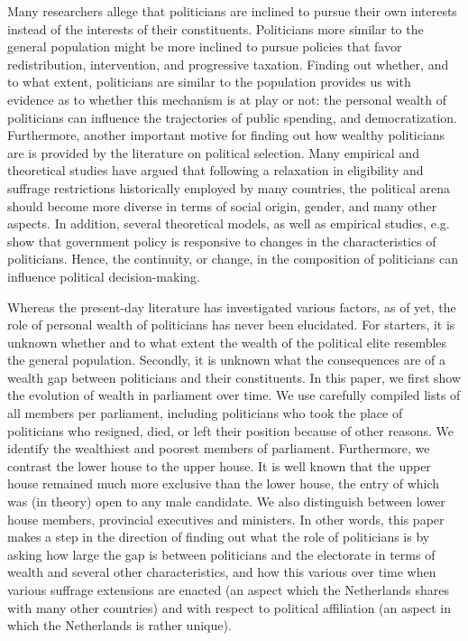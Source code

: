 Many researchers allege that politicians are inclined to pursue their own interests instead of the interests of their constituents. \autocite{lizzeri2004did, duggan2017political, corvalan2020political} Politicians more similar to the general population might be more inclined to pursue policies that favor redistribution, intervention, and progressive taxation. Finding out whether, and to what extent, politicians are similar to the population provides us with evidence as to whether this mechanism is at play or not: the personal wealth of politicians can influence the trajectories of public spending, and democratization. Furthermore, another important motive for finding out how wealthy politicians are is provided by the literature on political selection. Many empirical and theoretical studies have argued that following a relaxation in eligibility and suffrage restrictions historically employed by many countries, the political arena should  become more diverse in terms of social origin, gender, and many other aspects.\autocite{besley1997economic, besley2005political, bernini2018race} In addition, several theoretical models, as well as empirical studies, e.g.  show that government policy is responsive to changes in the characteristics of politicians. \autocite{meltzer1981rational, besley2011educated, chattopadhyay2004women, hayo2014political} Hence, the continuity, or change, in the composition of politicians can influence political decision-making. 

Whereas the present-day literature has investigated various factors, as of yet, the role of personal wealth of politicians has never been elucidated. For starters, it is unknown whether and to what extent the wealth of the political elite resembles the general population. Secondly, it is unknown what the consequences are of a wealth gap between politicians and their constituents. In this paper, we first show the evolution of wealth in parliament over time. We use carefully compiled lists of all members per parliament, including politicians who took the place of politicians who resigned, died, or left their position because of other reasons. We identify the wealthiest and poorest members of parliament. Furthermore, we contrast the lower house to the upper house. It is well known that the upper house remained much more exclusive than the lower house, the entry of which was (in theory) open to any male candidate. \autocite{van1983toegang} We also distinguish between lower house members, provincial executives and ministers. In other words, this paper makes a step in the direction of finding out what the role of politicians is by asking how large the gap is between politicians and the electorate in terms of wealth and several other characteristics, and how this various over time when various suffrage extensions are enacted (an aspect which the Netherlands shares with many other countries) and with respect to political affiliation (an aspect in which the Netherlands is rather unique). 

